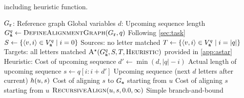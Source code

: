 \begin{algorithm}[t]
	\caption{\astarix including heuristic function.}\label{alg:astarix}
	\begin{algorithmic}[1]
		\State $G_\texttt{r}$: Reference graph \label{lin:reference}
		\Comment Global variables
		\State $d$: Upcoming sequence length \label{lin:d}
		\Statex
		 \label{lin:astarix}
			\State $\AG \gets \Call{DefineAlignmentGraph}{\RG, q}$
			\Comment Following \cref{sec:task}
			\State $S \gets \{\langle v,i \rangle \in V_\texttt{a}^{q} \mid i=0 \}$ \label{lin:starts}
			\Comment Sources: no letter matched
			\State $T \gets \{\langle v,i \rangle \in V_\texttt{a}^{q} \mid i=|q| \}$
			\Comment Targets: all letters matched
			\State \Return $\Call{\A}{\AG, S, T, \textsc{Heuristic}}$
			\Comment \A provided in \cref{app:astar} \label{lin:ret}
		\EndFunction
		\Statex
		 \label{lin:heuristic-start}
		\Comment Heuristic: Cost of upcoming sequence
			\State $d' \gets \min(d, |q|-i)$
			\Comment Actual length of upcoming sequence
			\State $s \gets q[i:i+d']$ \label{lin:s}
			\Comment Upcoming sequence (next $d$ letters after current)
			\State \Return $\Call{$h$}{u, s}$
			\label{lin:align-upcoming}
			\Comment Cost of aligning $s$ to $G_\texttt{e}$ starting from $u$
		\EndFunction \label{lin:heuristic-end}
		\Statex
		\Comment Cost of aligning $s$ starting from $u$
			\State \Return $\Call{RecursiveAlign}{u, s, 0.0, \infty}$
			\Comment Simple branch-and-bound \label{lin:recursive-align}
		\EndFunction
	\end{algorithmic}
\end{algorithm}
